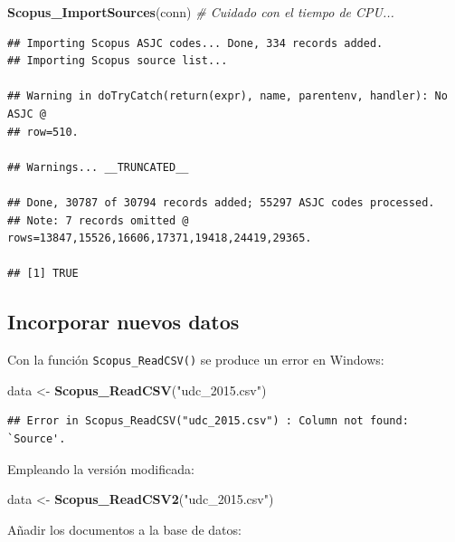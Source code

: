 \documentclass[
]{book}
\newenvironment{Shaded}{\begin{snugshade}}{\end{snugshade}}
\newcommand{\CommentTok}[1]{\textcolor[rgb]{0.56,0.35,0.01}{\textit{#1}}}
\newcommand{\FunctionTok}[1]{\textcolor[rgb]{0.13,0.29,0.53}{\textbf{#1}}}
\newcommand{\NormalTok}[1]{#1}
\newcommand{\OtherTok}[1]{\textcolor[rgb]{0.56,0.35,0.01}{#1}}
\newcommand{\StringTok}[1]{\textcolor[rgb]{0.31,0.60,0.02}{#1}}
\begin{document}
\begin{Shaded}
\begin{Highlighting}[]
\FunctionTok{Scopus\_ImportSources}\NormalTok{(conn) }\CommentTok{\# Cuidado con el tiempo de CPU...}
\end{Highlighting}
\end{Shaded}

\begin{verbatim}
## Importing Scopus ASJC codes... Done, 334 records added.
## Importing Scopus source list...

## Warning in doTryCatch(return(expr), name, parentenv, handler): No ASJC @
## row=510.

## Warnings... __TRUNCATED__

## Done, 30787 of 30794 records added; 55297 ASJC codes processed.
## Note: 7 records omitted @ rows=13847,15526,16606,17371,19418,24419,29365.

## [1] TRUE
\end{verbatim}

\hypertarget{incorporar-nuevos-datos}{%
\subsection{Incorporar nuevos datos}\label{incorporar-nuevos-datos}}

Con la función \texttt{Scopus\_ReadCSV()} se produce un error en Windows:

\begin{Shaded}
\begin{Highlighting}[]
\NormalTok{data }\OtherTok{\textless{}{-}}  \FunctionTok{Scopus\_ReadCSV}\NormalTok{(}\StringTok{"udc\_2015.csv"}\NormalTok{)}
\end{Highlighting}
\end{Shaded}

\begin{verbatim}
## Error in Scopus_ReadCSV("udc_2015.csv") : Column not found: `Source'.
\end{verbatim}

Empleando la versión modificada:

\begin{Shaded}
\begin{Highlighting}[]
\NormalTok{data }\OtherTok{\textless{}{-}}  \FunctionTok{Scopus\_ReadCSV2}\NormalTok{(}\StringTok{"udc\_2015.csv"}\NormalTok{)}
\end{Highlighting}
\end{Shaded}

Añadir los documentos a la base de datos:
\end{document}
